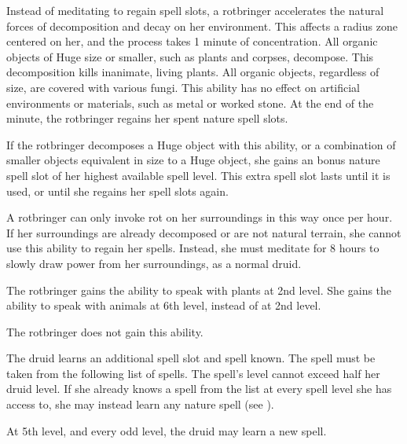              Instead of meditating to regain spell slots, a rotbringer accelerates the natural forces of decomposition and decay on her environment.
            This affects a \areahuge radius zone centered on her, and the process takes 1 minute of concentration.
            All organic objects of Huge size or smaller, such as plants and corpses, decompose.
            This decomposition kills inanimate, living plants.
            All organic objects, regardless of size, are covered with various fungi.
            This ability has no effect on artificial environments or materials, such as metal or worked stone.
            At the end of the minute, the rotbringer regains her spent nature spell slots.

            If the rotbringer decomposes a Huge object with this ability, or a combination of smaller objects equivalent in size to a Huge object, she gains an bonus nature spell slot of her highest available spell level.
            This extra spell slot lasts until it is used, or until she regains her spell slots again.

            A rotbringer can only invoke rot on her surroundings in this way once per hour.
            If her surroundings are already decomposed or are not natural terrain, she cannot use this ability to regain her spells.
            Instead, she must meditate for 8 hours to slowly draw power from her surroundings, as a normal druid.

             The rotbringer gains the ability to speak with plants at 2nd level.
            She gains the ability to speak with animals at 6th level, instead of at 2nd level.

             The rotbringer does not gain this ability.

             The druid learns an additional spell slot and spell known.
            The spell must be taken from the following list of spells.
            The spell's level cannot exceed half her druid level.
            If she already knows a spell from the list at every spell level she has access to, she may instead learn any nature spell (see ).

            At 5th level, and every odd level, the druid may learn a new spell.


